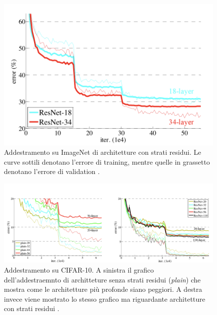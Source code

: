 \begin{figure}[h!]
    \centering
    \hspace*{-0.1in}
    \includegraphics[scale=0.7]{img/imagenet_resnet.png}
    \caption{Addestramento su ImageNet di architetture con strati residui. Le curve sottili denotano l'errore di training, mentre quelle in grassetto denotano l'errore di validation \cite{resnets}.}
    \label{fig:imagenet_resnet}
\end{figure}


\begin{figure}[h!]
    \centering
    \hspace*{-0.25in}
    \includegraphics[scale=0.6]{img/cifar10_comparison.png}
    \caption{Addestramento su CIFAR-10. A sinistra il grafico dell'addestraemnto di architteture senza strati residui (\textit{plain}) che mostra come le architetture più profonde siano peggiori. A destra invece viene mostrato lo stesso grafico ma riguardante architetture con strati residui \cite{resnets}.}
    \label{fig:cifar10_comparison}
\end{figure}


